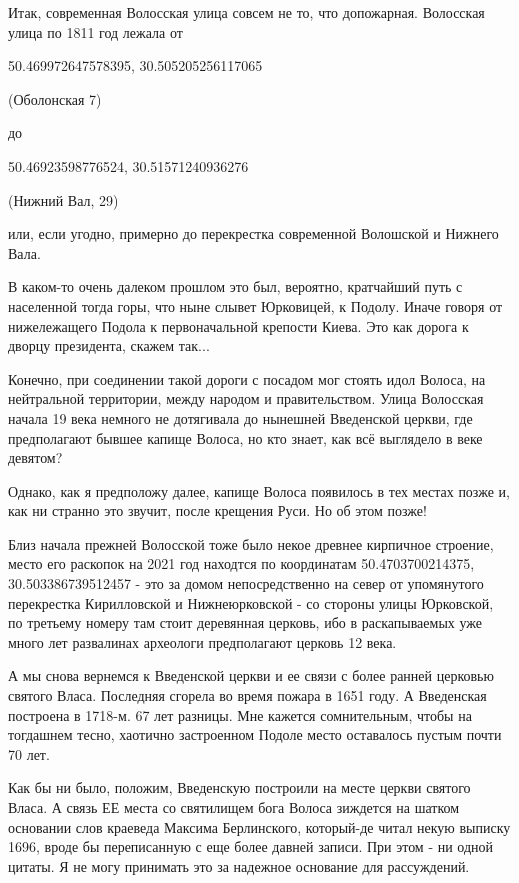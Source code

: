 \documentclass[a5paper,11pt,openany]{article}
\begin{document}
   Итак, современная Волосская улица совсем не то, что допожарная. Волосская улица по 1811 год лежала от 

50.469972647578395, 30.505205256117065

(Оболонская 7)

до 

50.46923598776524, 30.51571240936276

(Нижний Вал, 29)

или, если угодно, примерно до перекрестка современной Волошской и Нижнего Вала.

   В каком-то очень далеком прошлом это был, вероятно, кратчайший путь с населенной тогда горы, что ныне слывет Юрковицей, к Подолу. Иначе говоря от нижележащего Подола к первоначальной крепости Киева. Это как дорога  к дворцу президента, скажем так...

  Конечно, при соединении такой дороги с посадом мог стоять идол Волоса, на нейтральной территории, между народом и правительством. Улица Волосская начала 19 века немного не дотягивала до нынешней Введенской церкви, где предполагают бывшее капище Волоса, но кто знает, как всё выглядело в веке девятом?

   Однако, как я предположу далее, капище Волоса появилось в тех местах позже и, как ни странно это звучит, после крещения Руси. Но об этом позже!

    Близ начала прежней Волосской тоже было некое древнее кирпичное строение, место его раскопок на 2021 год находтся по координатам
50.4703700214375, 30.503386739512457 - это за домом непосредственно на север от упомянутого перекрестка Кирилловской и Нижнеюрковской - со стороны улицы Юрковской, по третьему номеру там стоит деревянная церковь, ибо в раскапываемых уже много лет развалинах археологи предполагают церковь 12 века. 

   А мы снова вернемся к Введенской церкви и ее связи с более ранней церковью святого Власа. Последняя сгорела во время пожара в 1651 году. А Введенская построена в 1718-м. 67 лет разницы. Мне кажется сомнительным, чтобы на тогдашнем тесно, хаотично застроенном Подоле место оставалось пустым почти 70 лет.

   Как бы ни было, положим, Введенскую построили на месте церкви святого Власа. А связь ЕЕ места со святилищем бога Волоса зиждется на шатком основании слов краеведа Максима Берлинского, который-де читал некую выписку 1696, вроде бы переписанную с еще более давней записи. При этом - ни одной цитаты. Я не могу принимать это за надежное основание для рассуждений.
\end{document}
